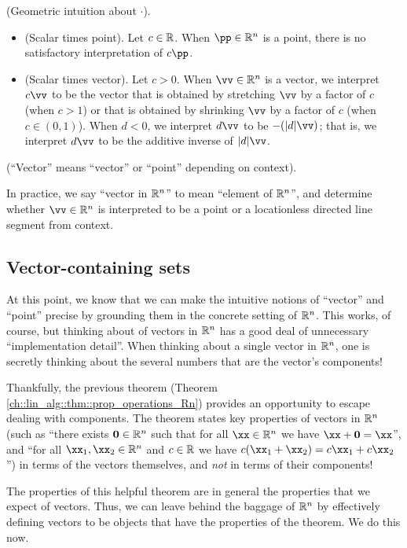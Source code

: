 \begin{remark}
    (Geometric intuition about $\cdot$).
    \begin{itemize}
        \item (Scalar times point). Let $c \in \mathbb{R}$. When $\pp \in \R^n$ is a point, there is no satisfactory interpretation of $c \pp$.
        \item (Scalar times vector). Let $c > 0$. When $\vv \in \R^n$ is a vector, we interpret $c \vv$ to be the vector that is obtained by stretching $\vv$ by a factor of $c$ (when $c > 1$) or that is obtained by shrinking $\vv$ by a factor of $c$ (when $c \in (0, 1)$). When $d < 0$, we interpret $d\vv$ to be $-(|d|\vv)$; that is, we interpret $d\vv$ to be the additive inverse of $|d|\vv$.
    \end{itemize}
\end{remark}

\begin{defn}
    (``Vector'' means ``vector'' or ``point'' depending on context).
    
    In practice, we say ``vector in $\mathbb{R}^n$'' to mean ``element of $\mathbb{R}^n$'', and determine whether $\vv \in \R^n$ is interpreted to be a point or a locationless directed line segment from context.
\end{defn}

\newpage

\subsection*{Vector-containing sets}

At this point, we know that we can make the intuitive notions of ``vector'' and ``point'' precise by grounding them in the concrete setting of $\mathbb{R}^n$. This works, of course, but thinking about of vectors in $\mathbb{R}^n$ has a good deal of unnecessary ``implementation detail''. When thinking about a single vector in $\mathbb{R}^n$, one is secretly thinking about the several numbers that are the vector's components!

Thankfully, the previous theorem (Theorem \ref{ch::lin_alg::thm::prop_operations_Rn}) provides an opportunity to escape dealing with components. The theorem states key properties of vectors in $\mathbb{R}^n$ (such as ``there exists $\mathbf{0} \in \mathbb{R}^n$ such that for all $\xx \in \R^n$ we have $\xx + \mathbf{0} = \xx$'', and ``for all $\xx_1, \xx_2 \in \R^n$ and $c \in \mathbb{R}$ we have $c(\xx_1 + \xx_2) = c\xx_1 + c\xx_2$'') in terms of the vectors themselves, and \textit{not} in terms of their components!

The properties of this helpful theorem are in general the properties that we expect of vectors. Thus, we can leave behind the baggage of $\mathbb{R}^n$ by effectively defining vectors to be objects that have the properties of the theorem. We do this now.

